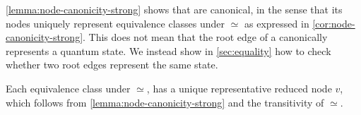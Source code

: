 \autoref{lemma:node-canonicity-strong} shows that  \limdds are canonical,
in the sense that its nodes 
uniquely represent equivalence classes under $\simeq$ as expressed in \autoref{cor:node-canonicity-strong}. This does not mean that the root edge of a \limdd canonically represents a quantum state. We instead show in \autoref{sec:equality} how to check whether two root edges represent the same state.











\begin{corollary}
    \label{cor:node-canonicity-strong}
    Each equivalence class under $\simeq$, has a unique representative reduced \limdd node $v$, which follows from \autoref{lemma:node-canonicity-strong} and the transitivity of $\simeq$.
\end{corollary}

